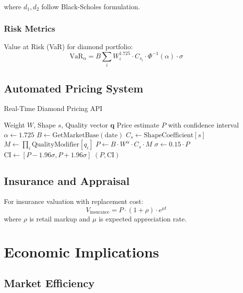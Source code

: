 \documentclass[12pt,a4paper]{article}
\theoremstyle{definition}
\theoremstyle{remark}
\begin{document}
where $d_1, d_2$ follow Black-Scholes formulation.

\subsubsection{Risk Metrics}

Value at Risk (VaR) for diamond portfolio:
\begin{equation}
\text{VaR}_{\alpha} = B \sum_{i} W_i^{1.725} \cdot C_{s_i} \cdot \Phi^{-1}(\alpha) \cdot \sigma
\end{equation}

\subsection{Automated Pricing System}

\begin{algorithm}
\caption{Real-Time Diamond Pricing API}
\begin{algorithmic}
\REQUIRE Weight $W$, Shape $s$, Quality vector $\mathbf{q}$
\ENSURE Price estimate $P$ with confidence interval
\STATE
\STATE $\alpha \leftarrow 1.725$
\STATE $B \leftarrow \text{GetMarketBase}(\text{date})$
\STATE $C_s \leftarrow \text{ShapeCoefficient}[s]$
\STATE $M \leftarrow \prod_{i} \text{QualityModifier}[q_i]$
\STATE $P \leftarrow B \cdot W^{\alpha} \cdot C_s \cdot M$
\STATE $\sigma \leftarrow 0.15 \cdot P$ 
\STATE $\text{CI} \leftarrow [P - 1.96\sigma, P + 1.96\sigma]$
\RETURN $(P, \text{CI})$
\end{algorithmic}
\end{algorithm}

\subsection{Insurance and Appraisal}

For insurance valuation with replacement cost:
\begin{equation}
V_{\text{insurance}} = P \cdot (1 + \rho) \cdot e^{\mu t}
\end{equation}
where $\rho$ is retail markup and $\mu$ is expected appreciation rate.

\section{Economic Implications}

\subsection{Market Efficiency}
\end{document}
